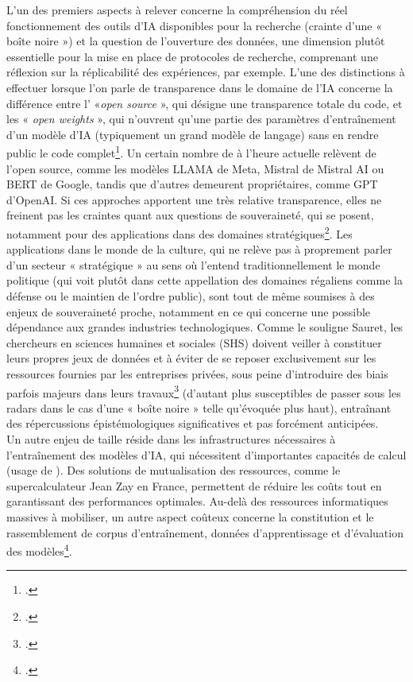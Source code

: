 L’un des premiers aspects à relever concerne la compréhension du réel fonctionnement des outils d’IA disponibles pour la recherche (crainte d’une « boîte noire ») et la question de l’ouverture des données, une dimension plutôt essentielle pour la mise en place de protocoles de recherche, comprenant une réflexion sur la réplicabilité des expériences, par exemple. L’une des distinctions à effectuer lorsque l’on parle de transparence dans le domaine de l’IA concerne la différence entre l’ «\textit{open source} », qui désigne une transparence totale du code, et les « \textit{open weights} », qui n’ouvrent qu’une partie des paramètres d’entraînement d’un modèle d’IA (typiquement un grand modèle de langage) sans en rendre public le code complet\footcite{ramlochan_openness_2023}. Un certain nombre de \llm à l’heure actuelle relèvent de l’open source, comme les modèles LLAMA de Meta, Mistral de Mistral AI ou BERT de Google, tandis que d’autres demeurent propriétaires, comme GPT d’OpenAI. 
Si ces approches apportent une très relative transparence, elles ne freinent pas les craintes quant aux questions de souveraineté, qui se posent, notamment pour des applications dans des domaines stratégiques\footcite[p.77]{pollotec_intelligence_2018}. Les applications dans le monde de la culture, qui ne relève pas à proprement parler d’un secteur « stratégique » au sens où l’entend traditionnellement le monde politique (qui voit plutôt dans cette appellation des domaines régaliens comme la défense ou le maintien de l’ordre public), sont tout de même soumises à des enjeux de souveraineté proche, notamment en ce qui concerne une possible dépendance aux grandes industries technologiques.
Comme le souligne Sauret, les chercheurs en sciences humaines et sociales (SHS) doivent veiller à constituer leurs propres jeux de données et à éviter de se reposer exclusivement sur les ressources fournies par les entreprises privées, sous peine d'introduire des biais parfois majeurs dans leurs travaux\footcite[p.102]{sauret_intelligence_2022} (d’autant plus susceptibles de passer sous les radars dans le cas d’une « boîte noire » telle qu’évoquée plus haut), entraînant des répercussions épistémologiques significatives et pas forcément anticipées.
\newline
{}\\

Un autre enjeu de taille réside dans les infrastructures nécessaires à l’entraînement des modèles d’IA, qui nécessitent d’importantes capacités de calcul (usage de \gpu). Des solutions de mutualisation des ressources, comme le supercalculateur Jean Zay en France, permettent de réduire les coûts tout en garantissant des performances optimales. Au-delà des ressources informatiques massives à mobiliser, un autre aspect coûteux concerne la constitution et le rassemblement de corpus d’entraînement, données d’apprentissage et d’évaluation des modèles\footcite{chague_lintelligence_2022}. 
\newline
{}\\

